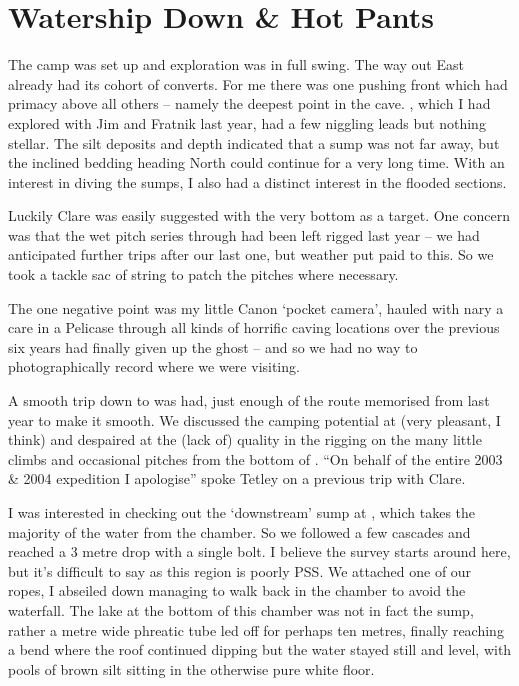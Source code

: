 \section{Watership Down \& Hot Pants}

The camp was set up and exploration was in full swing. The way out East
already had its cohort of converts. For me there was one pushing front
which had primacy above all others -- namely the deepest point in the
cave. , which I had explored with Jim and Fratnik
last year, had a few niggling leads but nothing stellar. The silt
deposits and depth indicated that a sump was not far away, but the
inclined bedding heading North could continue for a very long time. With
an interest in diving the sumps, I also had a distinct interest in the
flooded sections.

Luckily Clare was easily suggested with the very bottom as a target. One
concern was that the wet pitch series through  had been left
rigged last year -- we had anticipated further trips after our last one,
but weather put paid to this. So we took a tackle sac of string to patch
the pitches where necessary.

The one negative point was my little Canon `pocket camera', hauled with
nary a care in a Pelicase through all kinds of horrific caving locations
over the previous six years had finally given up the ghost -- and so we
had no way to photographically record where we were visiting.

A smooth trip down to  was had, just enough of the route
memorised from last year to make it smooth. We discussed the camping
potential at  (very pleasant, I think) and despaired at the (lack
of) quality in the rigging on the many little climbs and occasional
pitches from the bottom of . ``On behalf of the entire 2003 \&
2004 expedition I apologise'' spoke Tetley on a previous trip with
Clare.

I was interested in checking out the `downstream' sump at , which
takes the majority of the water from the  chamber. So we
followed a few cascades and reached a 3 metre drop with a single bolt. I
believe the survey starts around here, but it's difficult to say as this
region is poorly PSS. We attached one of our ropes, I abseiled down
managing to walk back in the chamber to avoid the waterfall. The lake at
the bottom of this chamber was not in fact the sump, rather a metre wide
phreatic tube led off for perhaps ten metres, finally reaching a bend
where the roof continued dipping but the water stayed still and level,
with pools of brown silt sitting in the otherwise pure white floor.

